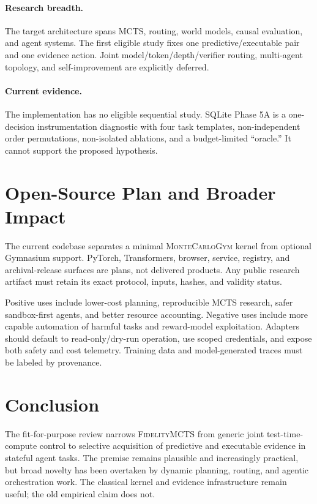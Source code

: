 \documentclass[10pt,twocolumn]{article}
\newcommand{\method}{\textsc{FidelityMCTS}\xspace}
\newcommand{\mcg}{\textsc{MonteCarloGym}\xspace}
\begin{document}
\paragraph{Research breadth.}
The target architecture spans MCTS, routing, world models, causal evaluation,
and agent systems. The first eligible study fixes one predictive/executable
pair and one evidence action. Joint model/token/depth/verifier routing,
multi-agent topology, and self-improvement are explicitly deferred.

\paragraph{Current evidence.}
The implementation has no eligible sequential study. SQLite Phase 5A is a
one-decision instrumentation diagnostic with four task templates,
non-independent order permutations, non-isolated ablations, and a
budget-limited ``oracle.'' It cannot support the proposed hypothesis.

\section{Open-Source Plan and Broader Impact}

The current codebase separates a minimal \mcg kernel from optional Gymnasium
support. PyTorch, Transformers, browser, service, registry, and archival-release
surfaces are plans, not delivered products. Any public research artifact must
retain its exact protocol, inputs, hashes, and validity status.

Positive uses include lower-cost planning, reproducible MCTS research, safer
sandbox-first agents, and better resource accounting. Negative uses include
more capable automation of harmful tasks and reward-model exploitation.
Adapters should default to read-only/dry-run operation, use scoped credentials,
and expose both safety and cost telemetry. Training data and model-generated
traces must be labeled by provenance.

\section{Conclusion}

The fit-for-purpose review narrows \method from generic joint test-time-compute
control to selective acquisition of predictive and executable evidence in
stateful agent tasks. The premise remains plausible and increasingly practical,
but broad novelty has been overtaken by dynamic planning, routing, and agentic
orchestration work. The classical kernel and evidence infrastructure remain
useful; the old empirical claim does not.
\end{document}
